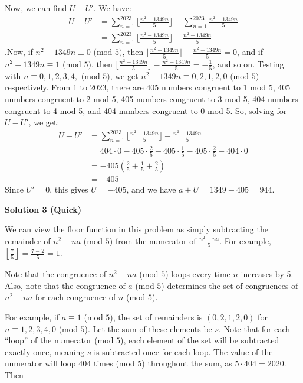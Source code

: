 \begin{enumerate}
{{ Now, we can find $U - U'$. We have:
 \begin{align*} U - U' &= \sum^{2023}_{n=1} {\lfloor \frac{n^2-1349n}{5} \rfloor} - \sum^{2023}_{n=1} {\frac{n^2-1349n}{5}} \\ &= \sum^{2023}_{n=1} {\lfloor \frac{n^2-1349n}{5} \rfloor - \frac{n^2-1349n}{5}} \end{align*}
.Now, if $n^2-1349n \equiv 0 \text{ (mod 5)}$, then $\lfloor \frac{n^2-1349n}{5} \rfloor - \frac{n^2-1349n}{5} = 0$, and if $n^2-1349n \equiv 1 \text{ (mod 5)}$, then $\lfloor \frac{n^2-1349n}{5} \rfloor - \frac{n^2-1349n}{5} = -\frac{1}{5}$, and so on. Testing with $n \equiv 0,1,2,3,4, \text{ (mod 5)}$, we get $n^2-1349n \equiv 0,2,1,2,0 \text{ (mod 5)}$ respectively. From 1 to 2023, there are 405 numbers congruent to 1 mod 5, 405 numbers congruent to 2 mod 5, 405 numbers congruent to 3 mod 5, 404 numbers congruent to 4 mod 5, and 404 numbers congruent to 0 mod 5. So, solving for $U - U'$, we get:
 \begin{align*} U - U' &= \sum^{2023}_{n=1} {\lfloor \frac{n^2-1349n}{5} \rfloor - \frac{n^2-1349n}{5}} \\ &= 404 \cdot 0 - 405 \cdot \frac{2}{5} - 405 \cdot \frac{1}{5} - 405 \cdot \frac{2}{5} - 404 \cdot 0 \\ &= -405(\frac{2}{5}+\frac{1}{5}+\frac{2}{5}) \\ &= -405 \end{align*}
Since $U' = 0$, this gives $U = -405$, and we have $a + U = 1349-405 = \boxed{944}$.

 



\textbf{Solution 3 (Quick)}

We can view the floor function in this problem as simply subtracting the remainder of $n^2 - na$ (mod $5$) from the numerator of  $\frac{n^2-na}{5}$. For example, $\left\lfloor \frac{7}{5} \right\rfloor = \frac{7-2}{5} = 1$.

 Note that the congruence of  $n^2 - na$ (mod $5$) loops every time $n$ increases by 5. Also, note that the congruence of $a$ (mod $5$) determines the set of congruences of $n^2 - na$ for each congruence of $n$ (mod $5$). 

 For example, if $a \equiv 1$ (mod $5$), the set of remainders is $(0, 2, 1, 2, 0)$ for $n \equiv 1,2,3,4,0$ (mod $5$). Let the sum of these elements be $s$. Note that for each “loop” of the numerator (mod $5$), each element of the set will be subtracted exactly once, meaning $s$ is subtracted once for each loop. The value of the numerator will loop $404$ times (mod $5$) throughout the sum, as $5 \cdot 404=2020$. Then 

}}
\end{enumerate}
